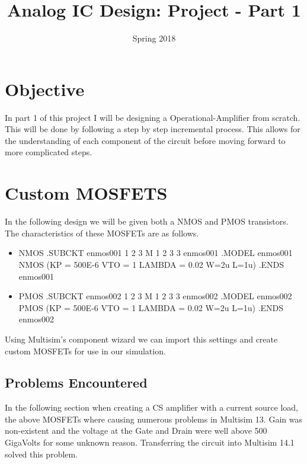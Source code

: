 \documentclass[12pt]{article}
\begin{document}
\title{Analog IC Design: Project - Part 1}
\date{Spring 2018}
\maketitle
\tableofcontents

\newpage
\section{Objective}

In part 1 of this project I will be designing a Operational-Amplifier from scratch. This will be done by following a step by step incremental process. This allows for the understanding of each component of the circuit before moving forward to more complicated steps.


\section{Custom MOSFETS}
\label{sec:desigan_and_analysis}

In the following design we will be given both a NMOS and PMOS transistors. The characteristics of these MOSFETs are as follows.

\begin{itemize}
	\item NMOS \newline \newline
	.SUBCKT enmos001 1 2 3 \newline
	M 1 2 3 3 enmos001\newline
	.MODEL enmos001 NMOS (KP = 500E-6 VTO = 1 LAMBDA = 0.02 W=2u L=1u)\newline
	.ENDS enmos001
\newline
	\item PMOS \newline \newline
	.SUBCKT enmos002 1 2 3 \newline
	M 1 2 3 3 enmos002\newline
	.MODEL enmos002 PMOS (KP = 500E-6 VTO = 1 LAMBDA = 0.02 W=2u L=1u)\newline
	.ENDS enmos002
\newline
	
\end{itemize}

Using Multisim's component wizard we can import this settings and create custom MOSFETs for use in our simulation.

\subsection{Problems Encountered}
In the following section when creating a CS amplifier with a current source load, the above MOSFETs where causing numerous problems in Multisim 13. Gain was non-existent and the voltage at the Gate and Drain were well above 500 GigaVolts for some unknown reason. Transferring the circuit into Multisim 14.1 solved this problem.
\end{document}
